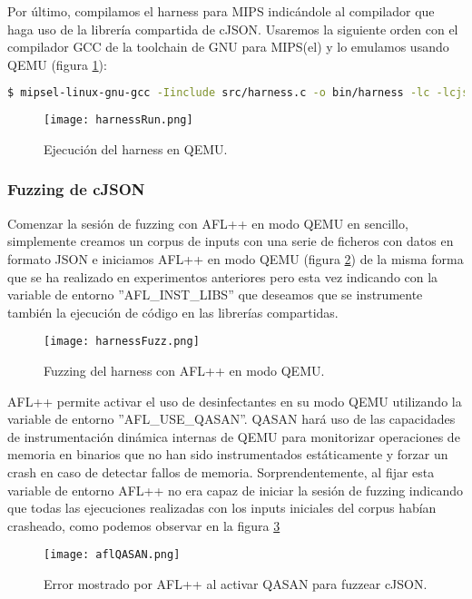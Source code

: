 Por último, compilamos el harness para MIPS indicándole al compilador que haga uso de la librería compartida de cJSON. Usaremos la 
siguiente orden con el compilador GCC de la toolchain de GNU para MIPS(el) y lo emulamos usando QEMU (figura \ref{fig:harnessRun}):

\begin{lstlisting}[language=bash]
    $ mipsel-linux-gnu-gcc -Iinclude src/harness.c -o bin/harness -lc -lcjson
\end{lstlisting}

\begin{figure}[H]
    \centering
    \texttt{[image: harnessRun.png]}
    \caption{Ejecución del harness en QEMU.}
    \label{fig:harnessRun}
\end{figure}

\subsubsection{Fuzzing de cJSON}
Comenzar la sesión de fuzzing con AFL++ en modo QEMU en sencillo, simplemente creamos un corpus de inputs 
con una serie de ficheros con datos en formato JSON e iniciamos AFL++ en modo QEMU (figura \ref{fig:harnessFuzz})
de la misma forma que se ha realizado en experimentos anteriores pero esta vez indicando con la variable de entorno
''AFL\_INST\_LIBS'' que deseamos que se instrumente también la ejecución de código en las librerías compartidas.

\begin{figure}[H]
    \centering
    \texttt{[image: harnessFuzz.png]}
    \caption{Fuzzing del harness con AFL++ en modo QEMU.}
    \label{fig:harnessFuzz}
\end{figure}

AFL++ permite activar el uso de desinfectantes en su modo QEMU utilizando la variable de entorno ''AFL\_USE\_QASAN''.
QASAN hará uso de las capacidades de instrumentación dinámica internas de QEMU para monitorizar operaciones de memoria 
en binarios que no han sido instrumentados estáticamente y forzar un crash en caso de detectar fallos de memoria. 
Sorprendentemente, al fijar esta variable de entorno AFL++ no era capaz de iniciar la sesión de fuzzing indicando que 
todas las ejecuciones realizadas con los inputs iniciales del corpus habían crasheado, como podemos 
observar en la figura \ref{fig:aflQASAN}

\begin{figure}[H]
    \centering
    \texttt{[image: aflQASAN.png]}
    \caption{Error mostrado por AFL++ al activar QASAN para fuzzear cJSON.}
    \label{fig:aflQASAN}
\end{figure}

